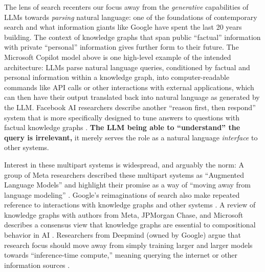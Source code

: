 The lens of search recenters our focus away from the \emph{generative}
capabilities of LLMs towards \emph{parsing} natural language: one of the
foundations of contemporary search and what information giants like
Google have spent the last 20 years building. The context of knowledge
graphs that span public ``factual'' information with private
``personal'' information gives further form to their future. The
Microsoft Copilot model above is one high-level example of the intended
architecture: LLMs parse natural language queries, conditioned by
factual and personal information within a knowledge graph, into
computer-readable commands like API calls or other interactions with
external applications, which can then have their output translated back
into natural language as generated by the LLM. Facebook AI researchers
describe another ``reason first, then respond'' system that is more
specifically designed to tune answers to questions with factual
knowledge graphs \cite{adolphsReasonFirstThen2021} . \textbf{The
LLM being able to ``understand'' the query is irrelevant,} it merely
serves the role as a natural language \emph{interface} to other systems.

Interest in these multipart systems is widespread, and arguably the
norm: A group of Meta researchers described these multipart systems as
``Augmented Language Models'' and highlight their promise as a way of
``moving away from language modeling'' \cite{mialonAugmentedLanguageModels2023} . Google's reimaginations of
search also make repeated reference to interactions with knowledge
graphs and other systems \cite{metzlerRethinkingSearchMaking2021} . A review of knowledge graphs with authors from Meta, JPMorgan
Chase, and Microsoft describes a consensus view that knowledge graphs
are essential to compositional behavior in AI \cite{chaudhriKnowledgeGraphsIntroduction2022} . Researchers from Deepmind
(owned by Google) argue that research focus should move away from simply
training larger and larger models towards ``inference-time compute,''
meaning querying the internet or other information sources \cite{lazaridouInternetaugmentedLanguageModels2022} .


